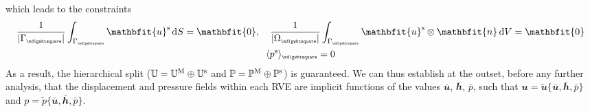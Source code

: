 \documentclass[12pt,a4paper]{article}
\renewcommand{\ta}[1]{\mathbfit{#1}}
\renewcommand{\ts}[1]{\mathbfit{#1}}
\renewcommand{\Box}{\mdlgwhtsquare}
\DeclarePairedDelimiter{\homgen}{\langle}{\rangle_\rve}
\newcommand{\volume}{|\Omega_\rve|}
\newcommand{\rve}{
  {\mathchoice
   {\mbox{\scalebox{0.67}{$\Box$}}}
   {\mbox{\scalebox{0.67}{$\Box$}}}
   {\mbox{\scalebox{0.5}{$\Box$}}}
   {\mbox{\scalebox{0.375}{$\Box$}}}
  }
}
\begin{document}
which leads to the constraints
\begin{subequations}\label{eq13}
\begin{gather}
    \frac{1}{|\Gamma_\rve|} \int_{\Gamma_\rve} \ta{u}^\fluct \dif S = \ta 0, \quad
    \frac{1}{\volume} \int_{\Gamma_\rve} \ta{u}^\fluct \outerp \ta n \dif V = \ts 0
\label{eq14a} \\
    \homgen{p^\fluct} = 0
\label{eq14b}
\end{gather}
\end{subequations}
As a result, the hierarchical split ($\mathbb{U} = \mathbb{U}^{\mathrm{M}} \oplus \mathbb{U}^{\mathrm{s}}$ and $\mathbb{P} = \mathbb{P}^{\mathrm{M}} \oplus \mathbb{P}^{\mathrm{s}}$) is guaranteed.
We can thus establish at the outset, before any further analysis, that the displacement and pressure fields within each RVE are implicit functions of the values $\bar{\ta u}$, $\bar{\ts h}$, $\bar{p}$, such that $\ta u = \tilde{\ta u}\{\bar{\ta u}, \bar{\ts h}, \bar{p}\}$ and $p = \tilde{p}\{\bar{\ta u}, \bar{\ts h}, \bar{p}\}$.
\end{document}
